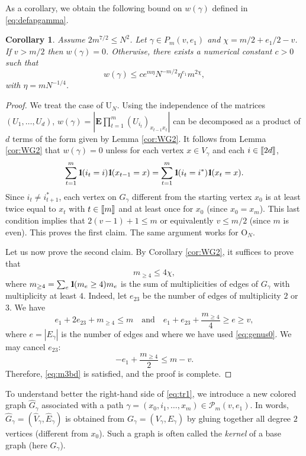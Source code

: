 \documentclass[11pt]{article}
\newtheorem{corollary}[lemma]{Corollary}
\newcommand{\dE}{\mathbf {E}}
\newcommand{\dU}{\mathrm {U}}
\newcommand{\dO}{\mathrm{O}}
\newcommand{\cP}{\mathcal {P}}
\newcommand{\AND}{\quad \mathrm{and} \quad}
\newcommand{\1}{1\!\!{\sf I}}
\newcommand{\IND}{\1}
\newcommand{\INT}[1]{{{\left[\hspace{-1.4pt}\left[#1\right]\hspace{-1.4pt}\right]}}}
\begin{document}
As a corollary, we obtain the following bound on $w(\gamma)$ defined in \eqref{eq:defapgamma}.
\begin{corollary}\label{le:pgamma} Assume $2 m^{7/2} \leq  N^{2}$.
Let $\gamma \in P_{m} (v, e_1)$ and $\chi = m/2 + e_1/2 - v$. If $v > m/2$ then $w(\gamma ) = 0$. Otherwise, 
there exists a numerical constant $c >0$ such that 
$$
w(\gamma) \leq c e^{m \eta} N^{ -  m/2}  \eta^{e_1} m  ^{ 2\chi  },
$$
with $\eta =  m N^{-1/4}$. 
\end{corollary}

\begin{proof}
We treat the case of $\dU_N$. Using the independence of the matrices $(U_1,\ldots,U_d)$, $w(\gamma ) =  |\dE \prod_{t=1}^m (U_{i_t})_{x_{t-1} x_t}|$ can be decomposed as a product of $d$ terms of the form given by Lemma \ref{cor:WG2}. 
It follows from Lemma \ref{cor:WG2} that
$w(\gamma) = 0$ unless for each vertex $x \in V_\gamma$ and each $i \in \INT{2d}$, $$\sum_{t = 1}^m \IND (i_t = i) \IND(x_{t-1} = x) = \sum_{t = 1}^m \IND (i_t = i^*) \IND (x_{t} = x).$$ Since $i_{t} \ne i^*_{t+1}$, each vertex on $G_\gamma$ different from the starting vertex $x_0$ is at least twice equal to $x_t$ with $t \in \INT{m}$ and at least once for $x_0$ (since $x_0 =x_m$). This
last condition implies that $2 (v -1) +1 \leq m $ or equivalently $v \leq m/2$ (since $m$ is even). This proves the first claim. The same argument works for $\dO_N$.


Let us now prove the second claim. By Corollary \ref{cor:WG2}, it suffices to prove that 
\begin{equation}\label{eq:m3bd}
m_{\geq 4} \leq  4 \chi ,
\end{equation}
where $m_{\geq 4} = \sum_{e} \IND(m_e \geq 4) m_e$ is the sum of multiplicities of edges of $G_\gamma$ with multiplicity at least $4$. 
Indeed, let $e_{23}$ be the number of edges of multiplicity $2$ or $3$. We have 
$$
e_1 + 2 e_{23} + m_{\geq 4} \leq m  \AND e_1 + e_{23} + \frac{m_{\geq 4}}{ 4} \geq e \geq v ,
$$
where $e = |E_\gamma|$ is the number of edges and where we have used \eqref{eq:genus0}. 
We may cancel $e_{23}$:
$$
-e_1 + \frac{m_{\geq 4}} { 2} \leq m - v. 
$$
Therefore, \eqref{eq:m3bd} is satisfied, and the proof is complete. \end{proof}

To understand better the right-hand side of \eqref{eq:tr1}, we introduce a new colored graph $\widehat G_\gamma$ associated with a path $\gamma = (x_0,i_1,\ldots, x_m) \in \cP_m(v,e_1)$. In words, $ \widehat G_\gamma = (\widehat V_\gamma , \widehat E_\gamma)$ is obtained from $G_\gamma =( V_\gamma, E_\gamma) $ by gluing together all degree $2$ vertices (different from $x_0$). Such a graph is often called the {\em kernel} of a base graph (here $G_\gamma$). 
\end{document}

